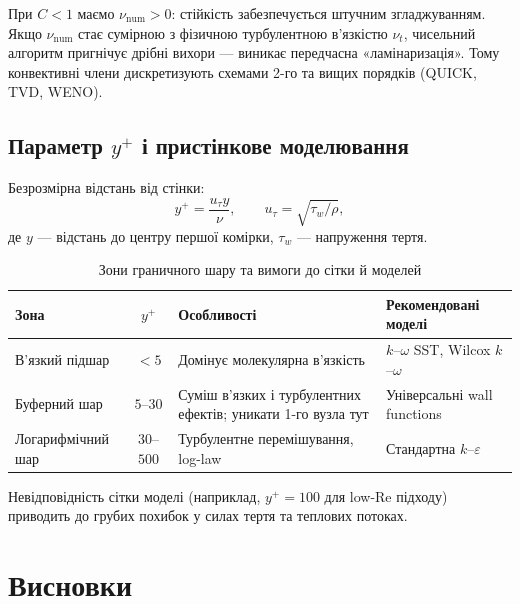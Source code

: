 \documentclass[14pt,a4paper,extarticle]{extarticle}
\begin{document}
При $C < 1$ маємо $\nu_{\mathrm{num}} > 0$: стійкість забезпечується
штучним згладжуванням. Якщо $\nu_{\mathrm{num}}$ стає сумірною з
фізичною турбулентною в'язкістю $\nu_t$, чисельний алгоритм пригнічує
дрібні вихори --- виникає передчасна «ламінаризація». Тому конвективні
члени дискретизують схемами 2-го та вищих порядків (QUICK, TVD, WENO).

\subsection{Параметр $y^+$ і пристінкове моделювання}

Безрозмірна відстань від стінки:
\begin{equation}
  y^+ = \frac{u_\tau y}{\nu},
  \qquad
  u_\tau = \sqrt{\tau_w / \rho},
  \label{eq:yplus}
\end{equation}
де $y$ --- відстань до центру першої комірки, $\tau_w$ --- напруження тертя.

\begin{table}[H]
  \caption{Зони граничного шару та вимоги до сітки й моделей}
  \label{tab:yplus}
  \centering
  \small
  \renewcommand{\arraystretch}{1.15}
  \begin{tabular}{|l|c|p{4.5cm}|p{3.8cm}|}
    \hline
    Зона & $y^+$ & Особливості & Рекомендовані моделі \\
    \hline
    В'язкий підшар & $< 5$ &
      Домінує молекулярна в'язкість &
      $k$--$\omega$ SST, Wilcox $k$--$\omega$ \\
    \hline
    Буферний шар & $5$--$30$ &
      Суміш в'язких і турбулентних ефектів; уникати 1-го вузла тут &
      Універсальні wall functions \\
    \hline
    Логарифмічний шар & $30$--$500$ &
      Турбулентне перемішування, log-law &
      Стандартна $k$--$\varepsilon$ \\
    \hline
  \end{tabular}
\end{table}

Невідповідність сітки моделі (наприклад, $y^+ = 100$ для low-Re підходу)
приводить до грубих похибок у силах тертя та теплових потоках.

\section{Висновки}
\end{document}

